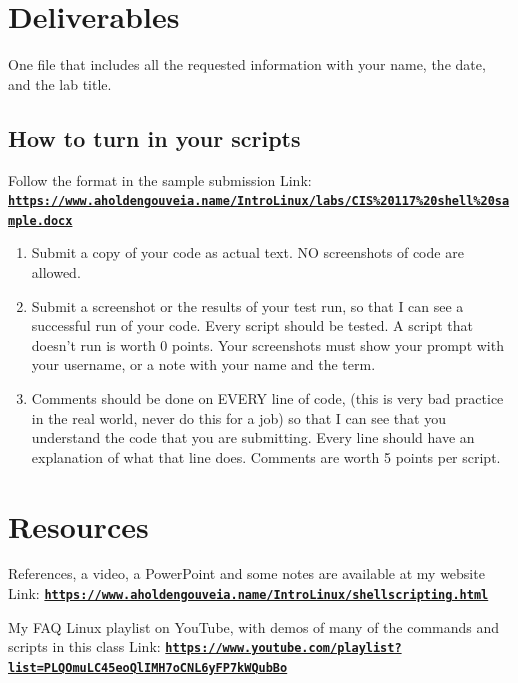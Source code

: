 \documentclass[12pt]{article}
\begin{document}
\section*{Deliverables}
One file that includes all the requested information with your name, the date, and the lab title.

\subsection*{How to turn in your scripts}
Follow the format in the sample submission Link: \href{https://www.aholdengouveia.name/IntroLinux/labs/CIS\%20117\%20shell\%20sample.docx}{\textbf{\nolinkurl{https://www.aholdengouveia.name/IntroLinux/labs/CIS\%20117\%20shell\%20sample.docx}}}
    \begin{enumerate}
        \item Submit a copy of your code as actual text. NO screenshots of code are allowed.
        \item Submit a screenshot or the results of your test run, so that I can see a successful run of your code. Every script should be tested.  A script that doesn't run is worth 0 points. Your screenshots must show your prompt with your username, or a note with your name and the term.
        \item Comments should be done on EVERY line of code, (this is very bad practice in the real world, never do this for a job) so that I can see that you understand the code that you are submitting. Every line should have an explanation of what that line does.  Comments are worth 5 points per script.
\end{enumerate}

\section*{Resources}
References, a video, a PowerPoint and some notes are available at my website
Link: \href{https://www.aholdengouveia.name/IntroLinux/shellscripting.html}{\textbf{\nolinkurl{https://www.aholdengouveia.name/IntroLinux/shellscripting.html}}}

My FAQ Linux playlist on YouTube, with demos of many of the commands and scripts in this class
Link: \href{https://www.youtube.com/playlist?list=PLQOmuLC45eoQlIMH7oCNL6yFP7kWQubBo}{\textbf{\nolinkurl{https://www.youtube.com/playlist?list=PLQOmuLC45eoQlIMH7oCNL6yFP7kWQubBo}}}
\end{document}
